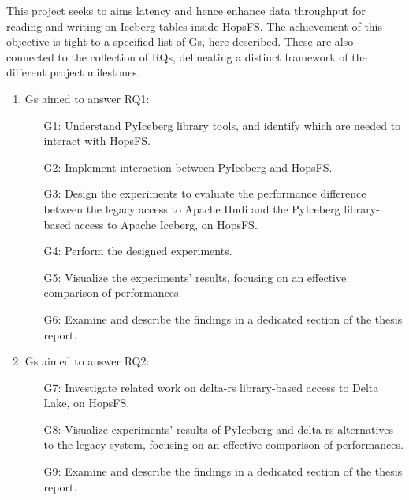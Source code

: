 This project seeks to aims latency and hence enhance data throughput for reading and writing on Iceberg tables inside \gls{HopsFS}. The achievement of this objective is tight to a specified list of \glspl{G}, here described. These are also connected to the collection of \glspl{RQ}, delineating a distinct framework of the different project milestones.

\begin{enumerate}
    \item \glspl{G} aimed to answer RQ1: 
        \begin{enumerate}
            \item[G1:] Understand PyIceberg library tools, and identify which are needed to interact with \gls{HopsFS}.
            \item[G2:] Implement interaction between PyIceberg and \gls{HopsFS}. 
            \item[G3:] Design the experiments to evaluate the performance difference between the legacy access to Apache Hudi and the PyIceberg library-based access to Apache Iceberg, on \gls{HopsFS}. 
            \item[G4:] Perform the designed experiments.
            \item[G5:] Visualize the experiments' results, focusing on an effective comparison of performances.
            \item[G6:] Examine and describe the findings in a dedicated section of the thesis report.
        \end{enumerate}
    \item \glspl{G} aimed to answer RQ2:
        \begin{enumerate}
            \item[G7:] Investigate related work on delta-rs library-based access to Delta Lake, on \gls{HopsFS}.
            \item[G8:] Visualize experiments' results of PyIceberg and delta-rs alternatives to the legacy system, focusing on an effective comparison of performances.
            \item[G9:] Examine and describe the findings in a dedicated section of the thesis report.
        \end{enumerate}
\end{enumerate}

